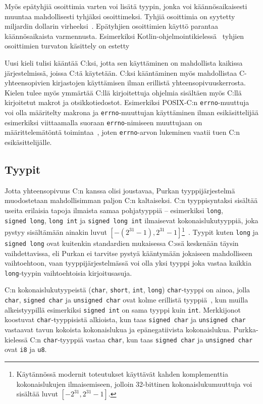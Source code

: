 Myös epätyhjiä osoittimia varten voi lisätä tyypin, jonka voi käännösaikaisesti
muuntaa mahdollisesti tyhjäksi osoittimeksi. Tyhjiä osoittimia on syytetty
miljardin dollarin virheeksi~\citep{billiondollars}. Epätyhjien osoittimien
käyttö parantaa käännösaikaista varmennusta. Esimerkiksi
Kotlin-ohjelmointikielessä~\citep{kotlin} tyhjien osoittimien turvaton
käsittely on estetty~\citep{kotlinnullability}

Uusi kieli tulisi kääntää C:ksi, jotta sen käyttäminen on mahdollista kaikissa
järjestelmissä, joissa C:tä käytetään. C:ksi kääntäminen myös mahdollistaa
C-yhteensopivien kirjastojen käyttämisen ilman erillistä
yhteensopivuuskerrosta. Kielen tulee myös ymmärtää C:llä kirjoitettuja ohjelmia
sisältäen myös C:llä kirjoitetut makrot ja otsikkotiedostot. Esimerkiksi
POSIX-C:n \texttt{errno}-muuttuja voi olla määritelty makrona ja
\texttt{errno}-muuttujan käyttäminen ilman esikäsittelijää esimerkiksi
viittaamalla suoraan \texttt{errno}-nimiseen muuttujaan on määrittelemätöntä
toimintaa~\citep[s. 234]{POSIX}, joten \texttt{errno}-arvon lukeminen vaatii
tuen C:n esikäsittelijälle.

\subsection{Tyypit}

Jotta yhteensopivuus C:n kanssa olisi joustavaa, Purkan tyyppijärjestelmä
muodostetaan mahdollisimman paljon C:n kaltaiseksi. C:n tyyppisyntaksi sisältää
useita erilaisia tapoja ilmaista samaa pohjatyyppiä -- esimerkiksi
\texttt{long}, \texttt{signed~long}, \texttt{long~int} ja
\texttt{signed~long~int} ilmaisevat kokonaislukutyyppiä, joka pystyy
sisältämään ainakin luvut $[-(2^{31} - 1), 2^{31}-1]$\footnote{Käytännössä
modernit toteutukset käyttävät kahden komplementtia kokonaislukujen
ilmaisemiseen, jolloin 32-bittinen kokonaislukumuuttuja voi sisältää luvut
$[-2^{31}, 2^{31} - 1]$.}~\citep[luku~5.2.4.2.1]{C18}. Tyypit kuten
\texttt{long} ja \texttt{signed long} ovat kuitenkin standardien mukaisessa
C:ssä keskenään täysin vaihdettavissa, eli Purkan ei tarvitse pystyä kääntymään
jokaiseen mahdolliseen vaihtoehtoon, vaan tyyppijärjestelmässä voi olla yksi
tyyppi joka vastaa kaikkia \texttt{long}-tyypin vaihtoehtoisia kirjoitusasuja.

C:n kokonaislukutyypeistä (\texttt{char}, \texttt{short}, \texttt{int},
\texttt{long}) \texttt{char}-tyyppi on ainoa, jolla \texttt{char},
\texttt{signed char} ja \texttt{unsigned char} ovat kolme erillistä
tyyppiä~\citep{C18}, kun muilla alkeistyypillä esimerkiksi \texttt{signed int}
on sama tyyppi kuin \texttt{int}. Merkkijonot koostuvat
\texttt{char}-tyyppisistä alkioista, kun taas \texttt{signed char} ja
\texttt{unsigned char} vastaavat tavun kokoista kokonaislukua ja
epänegatiivista kokonaislukua. Purkka-kielessä C:n \texttt{char}-tyyppiä
vastaa \texttt{char}, kun taas \texttt{signed char} ja \texttt{unsigned char}
ovat \texttt{i8} ja \texttt{u8}.

